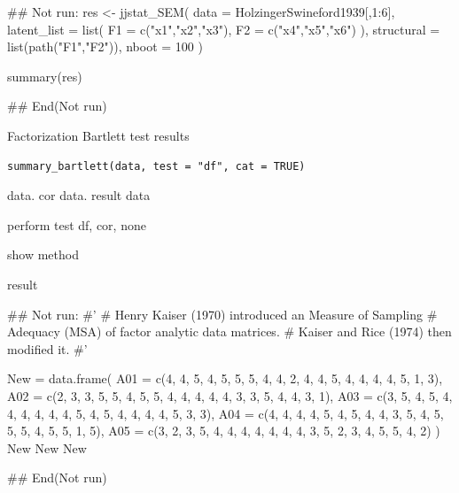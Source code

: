 \documentclass[a4paper]{book}
\begin{document}
\begin{Examples}
\begin{ExampleCode}
## Not run: 
res <- jjstat_SEM(
  data = HolzingerSwineford1939[,1:6],
  latent_list = list(
    F1 = c("x1","x2","x3"),
    F2 = c("x4","x5","x6")
  ),
  structural = list(path("F1","F2")),
  nboot = 100
)

summary(res)

## End(Not run)
\end{ExampleCode}
\end{Examples}
%
\begin{Description}
Factorization Bartlett test results
\end{Description}
%
\begin{Usage}
\begin{verbatim}
summary_bartlett(data, test = "df", cat = TRUE)
\end{verbatim}
\end{Usage}
%
\begin{Arguments}
\begin{ldescription}
\item[\code{data}] data. cor data. result data

\item[\code{test}] perform test df, cor, none

\item[\code{cat}] show method
\end{ldescription}
\end{Arguments}
%
\begin{Value}
result
\end{Value}
%
\begin{Examples}
\begin{ExampleCode}

## Not run: 
#'
# Henry Kaiser (1970) introduced an Measure of Sampling
# Adequacy  (MSA) of factor analytic data matrices.
# Kaiser and Rice (1974) then modified it.
#'

New = data.frame(
  A01 = c(4, 4, 5, 4, 5, 5, 5, 4, 4, 2, 4, 4, 5, 4, 4, 4, 4, 5, 1, 3),
  A02 = c(2, 3, 3, 5, 5, 4, 5, 5, 4, 4, 4, 4, 4, 3, 3, 5, 4, 4, 3, 1),
  A03 = c(3, 5, 4, 5, 4, 4, 4, 4, 4, 4, 5, 4, 5, 4, 4, 4, 4, 5, 3, 3),
  A04 = c(4, 4, 4, 4, 5, 4, 5, 4, 4, 3, 5, 4, 5, 5, 5, 4, 5, 5, 1, 5),
  A05 = c(3, 2, 3, 5, 4, 4, 4, 4, 4, 4, 4, 3, 5, 2, 3, 4, 5, 5, 4, 2)
)
New %
New %
New %


## End(Not run)
\end{ExampleCode}
\end{Examples}
\end{document}
